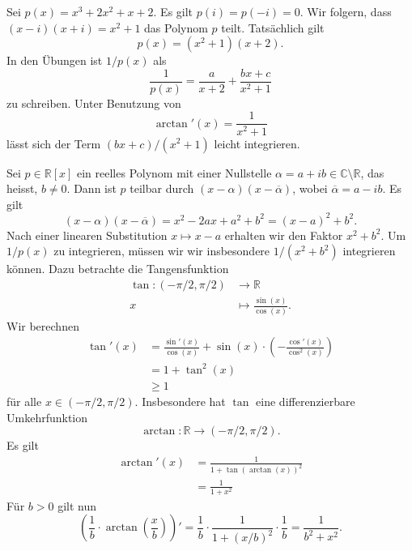 \documentclass[../main.tex]{subfiles}
\begin{document}
\begin{example}
  Sei $p(x) = x^3 + 2x^2 + x + 2$.
  Es gilt $p(i) = p(-i) = 0$.
  Wir folgern, dass $(x- i)(x + i) = x^2 + 1$ 
  das Polynom $p$ teilt. Tatsächlich gilt
  \[
    p(x) = (x^2 + 1)(x+2).
  \]
  In den Übungen ist $1/p(x)$ als
  \[
    \frac{1}{p(x)} = \frac{a}{x + 2}
    + \frac{bx + c}{x^2 + 1}
  \]
  zu schreiben. Unter Benutzung von
  \[
    \arctan'(x) = \frac{1}{x^2 + 1}
  \]
  lässt sich der Term $(bx + c)/(x^2 + 1)$ leicht integrieren.
\end{example}

\begin{remark}
  Sei $p \in \mathbb{R}[x]$ ein reelles Polynom mit
  einer Nullstelle $\alpha = a + ib \in \mathbb{C} \setminus \mathbb{R}$, das heisst, $b \neq 0$.
  Dann ist $p$ teilbar durch $(x - \alpha) (x - \overline \alpha)$,
  wobei $\overline \alpha = a - ib$.
  Es gilt
   \[
     (x - \alpha) ( x - \overline \alpha) = x^2 - 2ax + a^2 + b^2
     = {(x - a)}^2 + b^2.
  \]
  Nach einer linearen Substitution $x \mapsto x - a$
  erhalten wir den Faktor $x^2 + b^2$.
  Um $1/p(x)$ zu integrieren, müssen wir wir insbesondere
  $1/(x^2 + b^2)$ integrieren können.
  Dazu betrachte die Tangensfunktion
  \begin{align*}
    \tan \colon (-\pi/2, \pi/2) & \to \mathbb{R} \\
    x & \mapsto \frac{\sin(x)}{\cos(x)}.
  \end{align*}
  Wir berechnen
  \begin{align*}
    \tan'(x)
    &=\frac{\sin'(x)}{\cos(x)} + \sin(x) \cdot
    \left( - \frac{\cos'(x)}{\cos^2(x)} \right)\\
    &= 1 + \tan^2(x) \\
    &\geq 1
  \end{align*}
  für alle $x \in (-\pi/2, \pi/2)$.
  Insbesondere hat $\tan$ eine differenzierbare Umkehrfunktion
  \[
    \arctan \colon \mathbb{R} \to (- \pi/2, \pi/2).
  \]
  Es gilt
  \begin{align*}
    \arctan'(x)
    & = \frac{1}{1 + {\tan(\arctan(x))}^2}\\
    & = \frac{1}{1 + x^2}
  \end{align*}
  Für $b > 0$ gilt nun
  \[
    \left( \frac{1}{b} \cdot \arctan \left( \frac{x}{b} \right) \right)'
    = \frac{1}{b} \cdot \frac{1}{1 + {(x/b)}^2} \cdot \frac{1}{b}
    = \frac{1}{b^2 + x^2}.
  \]
  
  
  
  
  
  
\end{remark}
\end{document}
